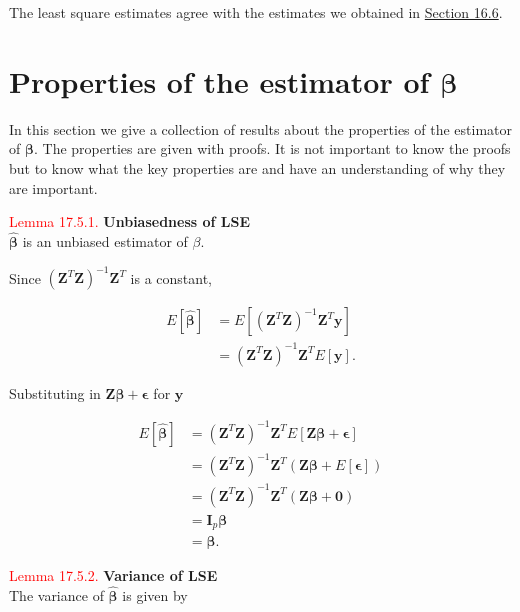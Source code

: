 \documentclass[
]{book}
\begin{document}
The least square estimates agree with the estimates we obtained in \protect\hyperlink{Sec_LinearI:line}{Section 16.6}.

\hypertarget{Sec_Linear_LSE:beta}{%
\section{\texorpdfstring{Properties of the estimator of \(\mathbf{\beta}\)}{Properties of the estimator of \textbackslash mathbf\{\textbackslash beta\}}}\label{Sec_Linear_LSE:beta}}

In this section we give a collection of results about the properties of the estimator of \(\mathbf{\beta}\). The properties are given with proofs. It is not important to know the proofs but to know what the key properties are and have an understanding of why they are important.

\leavevmode{}%
\textcolor{red}{Lemma 17.5.1.}
{\textbf{Unbiasedness of LSE}}\\
\(\mathbf{\hat{\beta}}\) is an unbiased estimator of \(\beta\).

Since \((\mathbf{Z}^T\mathbf{Z})^{-1}\mathbf{Z}^T\) is a constant,

\begin{align*}
E \left[ \mathbf{\hat{\beta}} \right] &= E \left[ (\mathbf{Z}^T\mathbf{Z})^{-1}\mathbf{Z}^T\mathbf{y} \right] \\
&= (\mathbf{Z}^T \mathbf{Z})^{-1} \mathbf{Z}^T E[\mathbf{y}]. 
\end{align*}

Substituting in \(\mathbf{Z}\mathbf{\beta} + \mathbf{\epsilon}\) for \(\mathbf{y}\)

\begin{align*}
E \left[ \mathbf{\hat{\beta}} \right]
&= (\mathbf{Z}^T \mathbf{Z})^{-1} \mathbf{Z}^T E[\mathbf{Z}\mathbf{\beta} + \mathbf{\epsilon}] \\
&= (\mathbf{Z}^T \mathbf{Z})^{-1} \mathbf{Z}^T (\mathbf{Z}\mathbf{\beta} + E[\mathbf{\epsilon}]) \\
&= (\mathbf{Z}^T \mathbf{Z})^{-1} \mathbf{Z}^T (\mathbf{Z}\mathbf{\beta} + \mathbf{0}) \\
&= \mathbf{I}_p \mathbf{\beta} \\ 
&= \mathbf{\beta}.
\end{align*}

\hfill\break

\hypertarget{Sec_Linear_LSE:lem:var}{}
\textcolor{red}{Lemma 17.5.2.}
{\textbf{Variance of LSE}}\\
The variance of \(\mathbf{\hat{\beta}}\) is given by
\end{document}
